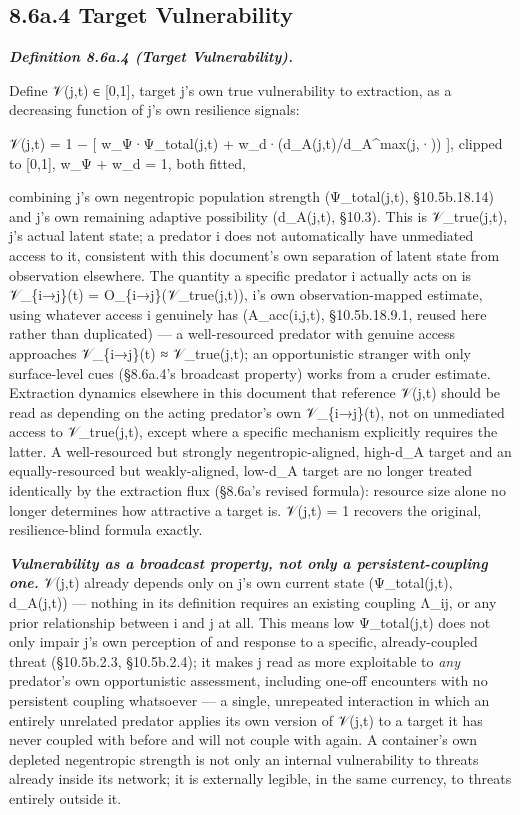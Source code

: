 \documentclass[
]{article}
\begin{document}
\hypertarget{a.4-target-vulnerability}{%
\subsection{8.6a.4 Target
Vulnerability}\label{a.4-target-vulnerability}}

\emph{\textbf{Definition 8.6a.4 (Target Vulnerability).}}

Define 𝒱(j,t) ∈ {[}0,1{]}, target j's own true vulnerability to
extraction, as a decreasing function of j's own resilience signals:

𝒱(j,t) = 1 − {[} w\_Ψ·Ψ\_total(j,t) + w\_d·(d\_A(j,t)/d\_A\^{}max(j,·))
{]}, clipped to {[}0,1{]}, w\_Ψ + w\_d = 1, both fitted,

combining j's own negentropic population strength (Ψ\_total(j,t),
§10.5b.18.14) and j's own remaining adaptive possibility (d\_A(j,t),
§10.3). This is 𝒱\_true(j,t), j's actual latent state; a predator i does
not automatically have unmediated access to it, consistent with this
document's own separation of latent state from observation elsewhere.
The quantity a specific predator i actually acts on is 𝒱\_\{i→j\}(t) =
O\_\{i→j\}(𝒱\_true(j,t)), i's own observation-mapped estimate, using
whatever access i genuinely has (A\_acc(i,j,t), §10.5b.18.9.1, reused
here rather than duplicated) --- a well-resourced predator with genuine
access approaches 𝒱\_\{i→j\}(t) ≈ 𝒱\_true(j,t); an opportunistic
stranger with only surface-level cues (§8.6a.4's broadcast property)
works from a cruder estimate. Extraction dynamics elsewhere in this
document that reference 𝒱(j,t) should be read as depending on the acting
predator's own 𝒱\_\{i→j\}(t), not on unmediated access to 𝒱\_true(j,t),
except where a specific mechanism explicitly requires the latter. A
well-resourced but strongly negentropic-aligned, high-d\_A target and an
equally-resourced but weakly-aligned, low-d\_A target are no longer
treated identically by the extraction flux (§8.6a's revised formula):
resource size alone no longer determines how attractive a target is.
𝒱(j,t) = 1 recovers the original, resilience-blind formula exactly.

\emph{\textbf{Vulnerability as a broadcast property, not only a
persistent-coupling one.}} 𝒱(j,t) already depends only on j's own
current state (Ψ\_total(j,t), d\_A(j,t)) --- nothing in its definition
requires an existing coupling Λ\_ij, or any prior relationship between i
and j at all. This means low Ψ\_total(j,t) does not only impair j's own
perception of and response to a specific, already-coupled threat
(§10.5b.2.3, §10.5b.2.4); it makes j read as more exploitable to
\emph{any} predator's own opportunistic assessment, including one-off
encounters with no persistent coupling whatsoever --- a single,
unrepeated interaction in which an entirely unrelated predator applies
its own version of 𝒱(j,t) to a target it has never coupled with before
and will not couple with again. A container's own depleted negentropic
strength is not only an internal vulnerability to threats already inside
its network; it is externally legible, in the same currency, to threats
entirely outside it.
\end{document}
